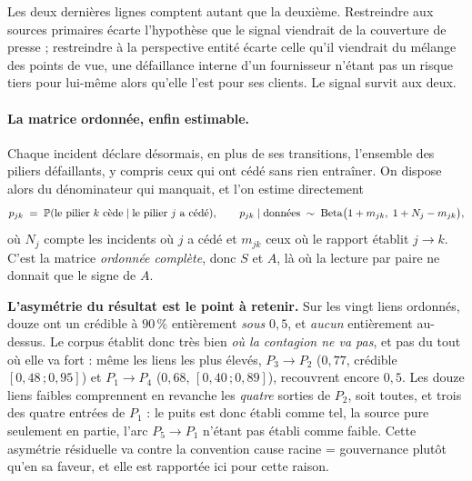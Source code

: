 \vspace{2pt}
Les deux dernières lignes comptent autant que la deuxième. Restreindre aux sources
primaires écarte l'hypothèse que le signal viendrait de la couverture de presse ; restreindre à
la perspective entité écarte celle qu'il viendrait du mélange des points de vue, une
défaillance interne d'un fournisseur n'étant pas un risque tiers pour lui-même alors qu'elle
l'est pour ses clients. Le signal survit aux deux.

\paragraph{La matrice ordonnée, enfin estimable.} Chaque incident déclare désormais, en plus de
ses transitions, l'ensemble des piliers défaillants, y compris ceux qui ont cédé sans
rien entraîner. On dispose alors du dénominateur qui manquait, et l'on estime directement
\begin{equation}
  p_{jk} \;=\; \mathbb{P}(\text{le pilier } k \text{ cède} \mid \text{le pilier } j \text{ a cédé}),
  \qquad
  p_{jk}\mid\text{données} \;\sim\; \mathrm{Beta}\bigl(1+m_{jk},\;1+N_j-m_{jk}\bigr),
  \label{eq:pjk}
\end{equation}
où $N_j$ compte les incidents où $j$ a cédé et $m_{jk}$ ceux où le rapport établit $j\to k$.
C'est la matrice \emph{ordonnée complète}, donc $S$ et $A$, là où la lecture par paire
ne donnait que le signe de $A$.

\begin{attention}
\textbf{L'asymétrie du résultat est le point à retenir.} Sur les vingt liens
ordonnés, douze ont un crédible à $90\,\%$ entièrement \emph{sous} $0{,}5$, et
\emph{aucun} entièrement au-dessus. Le corpus établit donc très bien \emph{où la contagion ne
va pas}, et pas du tout où elle va fort : même les liens les plus élevés, $P_3\to P_2$
($0{,}77$, crédible $[0{,}48\,;0{,}95]$) et $P_1\to P_4$ ($0{,}68$, $[0{,}40\,;0{,}89]$),
recouvrent encore $0{,}5$. Les douze liens faibles comprennent en revanche les
\emph{quatre} sorties de $P_2$, soit toutes, et trois des quatre entrées de $P_1$ : le puits est
donc établi comme tel, la source pure seulement en partie, l'arc $P_5 \to P_1$ n'étant pas établi
comme faible. Cette asymétrie résiduelle va contre la convention \og{}cause racine =
gouvernance\fg{} plutôt qu'en sa faveur, et elle est rapportée ici pour cette raison.
\end{attention}

